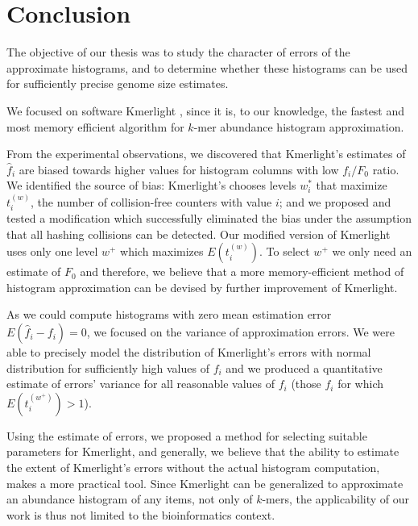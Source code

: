 \chapter*{Conclusion}

The objective of our thesis was to study the character of errors
of the approximate histograms, and to determine whether these histograms
can be used for sufficiently precise genome size estimates.

\medskip
We focused on software Kmerlight \cite{Sivadasan2016}, since it 
is, to our knowledge, the fastest and most memory efficient algorithm for
$k$-mer abundance histogram approximation. 

From the experimental observations, we discovered that Kmerlight's estimates 
of $\hat f_i$ are biased towards higher values for histogram columns
with low $f_i / F_0$ ratio. We identified the source of bias: Kmerlight's
chooses levels $w_i^*$ that maximize $t_i^{(w)}$, the number of collision-free
counters with value $i$; and we proposed and tested a modification which successfully
eliminated the bias under the assumption that all hashing collisions can be detected. 
Our modified version of Kmerlight uses only one level $w^+$ which
maximizes $E(t_i^{(w)})$. To select $w^+$ we only need an estimate of $F_0$ and therefore,
we believe that a more memory-efficient method of histogram approximation can be devised by
further improvement of Kmerlight. 

As we could compute histograms with zero mean estimation error $E(\hat f_i - f_i) = 0$,
we focused on the variance of approximation errors. We were able to precisely model the
distribution of Kmerlight's errors with normal distribution for sufficiently high values of
$f_i$ and we produced a quantitative estimate of errors' variance for all reasonable values of $f_i$
(those $f_i$ for which $E(t_i^{(w^+)}) > 1$). 

Using the estimate of errors, we proposed a method
for selecting suitable parameters for Kmerlight, and generally, we believe that the 
ability to estimate the extent of Kmerlight's errors without the actual histogram computation, 
makes a more practical tool.
Since Kmerlight can be generalized to approximate an abundance histogram of any items,
not only of $k$-mers, the applicability of our work is thus not limited to the
bioinformatics context. 


